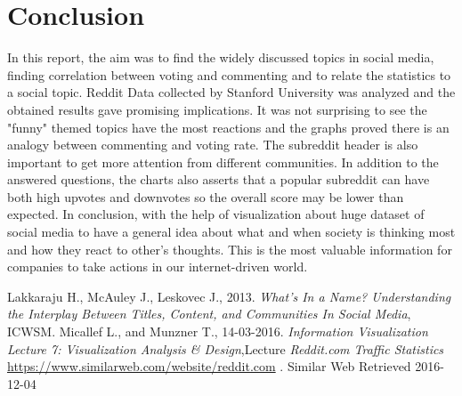 \documentclass[a4paper]{article}
\begin{document}
\section{Conclusion}
In this report, the aim was to find the widely discussed topics in social media, finding correlation between voting and commenting and to relate the statistics to a social topic. Reddit Data collected by Stanford University was analyzed and the obtained results gave promising implications. It was not surprising to see the "funny" themed topics have the most reactions and the graphs proved there is an analogy between commenting and voting rate. The subreddit header is also important to get more attention from different communities. In addition to the answered questions, the charts also asserts that a popular subreddit can have both high upvotes and downvotes so the overall score may be lower than expected. 
In conclusion, with the help of visualization about huge dataset of social media to have a general idea about what and when society is thinking most and how they react to other's thoughts. This is the most valuable information for companies to take actions in our internet-driven world. 
\begin{thebibliography}{1}
Lakkaraju H., McAuley J., Leskovec J., 2013. \textit{What's In a Name? Understanding the Interplay Between Titles, Content, and Communities In Social Media}, ICWSM.
Micallef L., and Munzner T., 14-03-2016. \textit{Information Visualization Lecture 7: Visualization Analysis \& Design},Lecture
\textit{Reddit.com Traffic Statistics}
\url{https://www.similarweb.com/website/reddit.com} 
. Similar Web
Retrieved 2016-12-04
\end{thebibliography}
\end{document}
